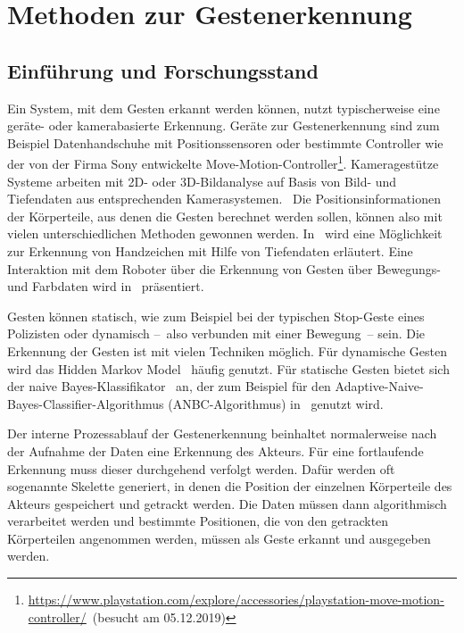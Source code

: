 \chapter{Methoden zur Gestenerkennung} \label{Gestenerkennungskapitel}

\section{Einführung und Forschungsstand}
Ein System, mit dem Gesten erkannt werden können, nutzt typischerweise eine geräte- oder kamerabasierte Erkennung. Geräte zur Gestenerkennung sind zum Beispiel Datenhandschuhe mit Positionssensoren oder bestimmte Controller wie der von der Firma Sony entwickelte Move-Motion-Controller\footnote{\url{https://www.playstation.com/explore/accessories/playstation-move-motion-controller/}~(besucht am 05.12.2019)}. Kameragestütze Systeme arbeiten mit 2D- oder 3D-Bildanalyse auf Basis von Bild- und Tiefendaten aus entsprechenden Kamerasystemen.~\cite{recognitionSurvey} Die Positionsinformationen der Körperteile, aus denen die Gesten berechnet werden sollen, können also mit vielen unterschiedlichen Methoden gewonnen werden. In~\cite{depthRecognition} wird eine Möglichkeit zur Erkennung von Handzeichen mit Hilfe von Tiefendaten erläutert. Eine Interaktion mit dem Roboter über die Erkennung von Gesten über Bewegungs- und Farbdaten wird in~\cite{colorRecognition} präsentiert.

Gesten können statisch, wie zum Beispiel bei der typischen Stop-Geste eines Polizisten oder dynamisch --~also verbunden mit einer Bewegung~-- sein. Die Erkennung der Gesten ist mit vielen Techniken möglich. Für dynamische Gesten wird das Hidden Markov Model~\cite{hiddenMarkov} häufig genutzt. Für statische Gesten bietet sich der naive Bayes-Klassifikator~\cite{patternClassification1} an, der zum Beispiel für den Adaptive-Naive-Bayes-Classifier-Algorithmus (ANBC-Algorithmus) in~\cite{gillianANBC} genutzt wird.

Der interne Prozessablauf der Gestenerkennung beinhaltet normalerweise nach der Aufnahme der Daten eine Erkennung des Akteurs. Für eine fortlaufende Erkennung muss dieser durchgehend verfolgt werden. Dafür werden oft sogenannte Skelette generiert, in denen die Position der einzelnen Körperteile des Akteurs gespeichert und getrackt werden. Die Daten müssen dann algorithmisch verarbeitet werden und bestimmte Positionen, die von den getrackten Körperteilen angenommen werden, müssen als Geste erkannt und ausgegeben werden.~\cite{hannaKinect3}

